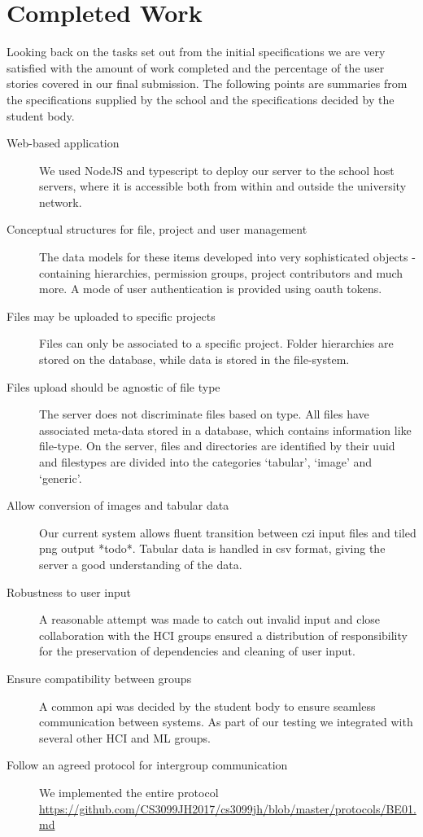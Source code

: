 \section{Completed Work}
Looking back on the tasks set out from the initial specifications we are very satisfied with the amount of work completed and the percentage of the user stories covered in our final submission. The following points are summaries from the specifications supplied by the school and the specifications decided by the student body. 

\begin{description}
\item[Web-based application] We used NodeJS and typescript to deploy our server to the school host servers, where it is accessible both from within and outside the university network.
\item[Conceptual structures for file, project and user management] The data models for these items developed into very sophisticated objects - containing hierarchies, permission groups, project contributors and much more. A mode of user authentication is provided using oauth tokens. 
\item[Files may be uploaded to specific projects] Files can only be associated to a specific project. Folder hierarchies are stored on the database, while data is stored in the file-system.
\item[Files upload should be agnostic of file type] The server does not discriminate files based on type. All files have associated meta-data stored in a database, which contains information like file-type. On the server, files and directories are identified by their uuid and filestypes are divided into the categories `tabular', `image' and `generic'.
\item[Allow conversion of images and tabular data] Our current system allows fluent transition between czi input files and tiled png output *todo*. Tabular data is handled in csv format, giving the server a good understanding of the data.
\item[Robustness to user input] A reasonable attempt was made to catch out invalid input and close collaboration with the HCI groups ensured a distribution of responsibility for the preservation of dependencies and cleaning of user input.
\item[Ensure compatibility between groups] A common api was decided by the student body to ensure seamless communication between systems. As part of our testing we integrated with several other HCI and ML groups. 
\item[Follow an agreed protocol for intergroup communication] We implemented the entire protocol \url{https://github.com/CS3099JH2017/cs3099jh/blob/master/protocols/BE01.md}
\end{description}

